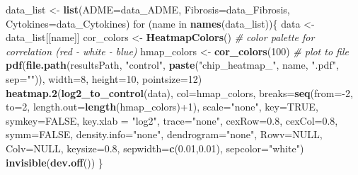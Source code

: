 \documentclass[]{article}
\newenvironment{Shaded}{\begin{snugshade}}{\end{snugshade}}
\newcommand{\KeywordTok}[1]{\textcolor[rgb]{0.13,0.29,0.53}{\textbf{{#1}}}}
\newcommand{\DataTypeTok}[1]{\textcolor[rgb]{0.13,0.29,0.53}{{#1}}}
\newcommand{\DecValTok}[1]{\textcolor[rgb]{0.00,0.00,0.81}{{#1}}}
\newcommand{\FloatTok}[1]{\textcolor[rgb]{0.00,0.00,0.81}{{#1}}}
\newcommand{\StringTok}[1]{\textcolor[rgb]{0.31,0.60,0.02}{{#1}}}
\newcommand{\CommentTok}[1]{\textcolor[rgb]{0.56,0.35,0.01}{\textit{{#1}}}}
\newcommand{\OtherTok}[1]{\textcolor[rgb]{0.56,0.35,0.01}{{#1}}}
\newcommand{\NormalTok}[1]{{#1}}
\begin{document}
\begin{Shaded}
\begin{Highlighting}[]
\NormalTok{data_list <-}\StringTok{ }\KeywordTok{list}\NormalTok{(}\DataTypeTok{ADME=}\NormalTok{data_ADME, }
                  \DataTypeTok{Fibrosis=}\NormalTok{data_Fibrosis, }
                  \DataTypeTok{Cytokines=}\NormalTok{data_Cytokines)}
\NormalTok{for (name in }\KeywordTok{names}\NormalTok{(data_list))\{}
  \NormalTok{data <-}\StringTok{ }\NormalTok{data_list[[name]]}
  \NormalTok{cor_colors <-}\StringTok{ }\KeywordTok{HeatmapColors}\NormalTok{() }\CommentTok{# color palette for correlation (red - white - blue)}
  \NormalTok{hmap_colors <-}\StringTok{ }\KeywordTok{cor_colors}\NormalTok{(}\DecValTok{100}\NormalTok{)}
  \CommentTok{# plot to file}
  \KeywordTok{pdf}\NormalTok{(}\KeywordTok{file.path}\NormalTok{(resultsPath, }\StringTok{"control"}\NormalTok{, }\KeywordTok{paste}\NormalTok{(}\StringTok{"chip_heatmap_"}\NormalTok{, name, }\StringTok{".pdf"}\NormalTok{, }\DataTypeTok{sep=}\StringTok{""}\NormalTok{)), }
      \DataTypeTok{width=}\DecValTok{8}\NormalTok{, }\DataTypeTok{height=}\DecValTok{10}\NormalTok{, }\DataTypeTok{pointsize=}\DecValTok{12}\NormalTok{) }
  \KeywordTok{heatmap.2}\NormalTok{(}\KeywordTok{log2_to_control}\NormalTok{(data), }\DataTypeTok{col=}\NormalTok{hmap_colors, }\DataTypeTok{breaks=}\KeywordTok{seq}\NormalTok{(}\DataTypeTok{from=}\NormalTok{-}\DecValTok{2}\NormalTok{, }\DataTypeTok{to=}\DecValTok{2}\NormalTok{, }\DataTypeTok{length.out=}\KeywordTok{length}\NormalTok{(hmap_colors)+}\DecValTok{1}\NormalTok{),}
            \DataTypeTok{scale=}\StringTok{"none"}\NormalTok{,}
            \DataTypeTok{key=}\OtherTok{TRUE}\NormalTok{, }\DataTypeTok{symkey=}\OtherTok{FALSE}\NormalTok{, }\DataTypeTok{key.xlab =} \StringTok{"log2"}\NormalTok{,}
            \DataTypeTok{trace=}\StringTok{"none"}\NormalTok{, }\DataTypeTok{cexRow=}\FloatTok{0.8}\NormalTok{, }\DataTypeTok{cexCol=}\FloatTok{0.8}\NormalTok{,}
            \DataTypeTok{symm=}\OtherTok{FALSE}\NormalTok{,}
            \DataTypeTok{density.info=}\StringTok{"none"}\NormalTok{, }\DataTypeTok{dendrogram=}\StringTok{"none"}\NormalTok{, }
            \DataTypeTok{Rowv=}\OtherTok{NULL}\NormalTok{, }\DataTypeTok{Colv=}\OtherTok{NULL}\NormalTok{, }
            \DataTypeTok{keysize=}\FloatTok{0.8}\NormalTok{,}
            \DataTypeTok{sepwidth=}\KeywordTok{c}\NormalTok{(}\FloatTok{0.01}\NormalTok{,}\FloatTok{0.01}\NormalTok{),}
            \DataTypeTok{sepcolor=}\StringTok{"white"}\NormalTok{)}
  \KeywordTok{invisible}\NormalTok{(}\KeywordTok{dev.off}\NormalTok{())}
\NormalTok{\}}
\end{Highlighting}
\end{Shaded}
\end{document}
